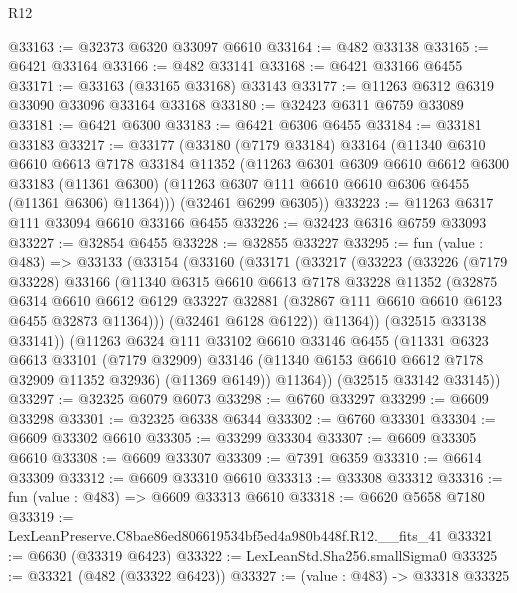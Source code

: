 \begin{lexlean}{R12}
\begin{coremodule}
@33163 := @32373 @6320 @33097 @6610
@33164 := @482 @33138
@33165 := @6421 @33164
@33166 := @482 @33141
@33168 := @6421 @33166 @6455
@33171 := @33163 (@33165 @33168) @33143
@33177 := @11263 @6312 @6319 @33090 @33096 @33164 @33168
@33180 := @32423 @6311 @6759 @33089
@33181 := @6421 @6300
@33183 := @6421 @6306 @6455
@33184 := @33181 @33183
@33217 := @33177
    (@33180
      (@7179 @33184)
      @33164
      (@11340
        @6310
        @6610
        @6613
        @7178
        @33184
        @11352
        (@11263
          @6301
          @6309
          @6610
          @6612
          @6300
          @33183
          (@11361 @6300)
          (@11263 @6307 @111 @6610 @6610 @6306 @6455 (@11361 @6306) @11364)))
      (@32461 @6299 @6305))
@33223 := @11263 @6317 @111 @33094 @6610 @33166 @6455
@33226 := @32423 @6316 @6759 @33093
@33227 := @32854 @6455
@33228 := @32855 @33227
@33295 := fun (value : @483) =>
  @33133
    (@33154
      (@33160
        (@33171
          (@33217
            (@33223
              (@33226
                (@7179 @33228)
                @33166
                (@11340
                  @6315
                  @6610
                  @6613
                  @7178
                  @33228
                  @11352
                  (@32875
                    @6314
                    @6610
                    @6612
                    @6129
                    @33227
                    @32881
                    (@32867 @111 @6610 @6610 @6123 @6455 @32873 @11364)))
                (@32461 @6128 @6122))
              @11364))
          (@32515 @33138 @33141))
        (@11263
          @6324
          @111
          @33102
          @6610
          @33146
          @6455
          (@11331
            @6323
            @6613
            @33101
            (@7179 @32909)
            @33146
            (@11340 @6153 @6610 @6612 @7178 @32909 @11352 @32936)
            (@11369 @6149))
          @11364))
      (@32515 @33142 @33145))
@33297 := @32325 @6079 @6073
@33298 := @6760 @33297
@33299 := @6609 @33298
@33301 := @32325 @6338 @6344
@33302 := @6760 @33301
@33304 := @6609 @33302 @6610
@33305 := @33299 @33304
@33307 := @6609 @33305 @6610
@33308 := @6609 @33307
@33309 := @7391 @6359
@33310 := @6614 @33309
@33312 := @6609 @33310 @6610
@33313 := @33308 @33312
@33316 := fun (value : @483) => @6609 @33313 @6610
@33318 := @6620 @5658 @7180
@33319 := LexLeanPreserve.C8bae86ed806619534bf5ed4a980b448f.R12.__fits_41
@33321 := @6630 (@33319 @6423)
@33322 := LexLeanStd.Sha256.smallSigma0
@33325 := @33321 (@482 (@33322 @6423))
@33327 := (value : @483) -> @33318 @33325

\end{coremodule}
\end{lexlean}
